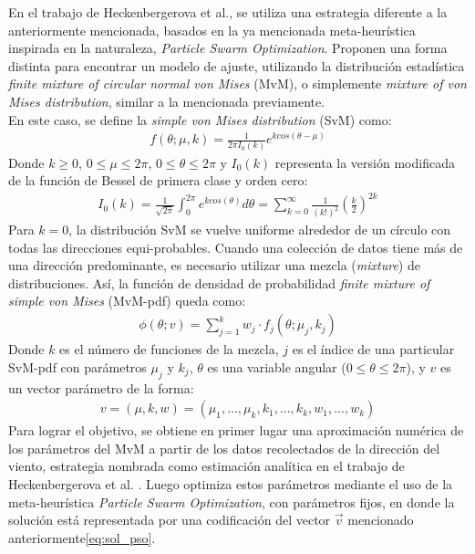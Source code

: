 En el trabajo de Heckenbergerova et al.\cite{Heckenbergerova15}, se utiliza una estrategia diferente a la anteriormente mencionada, basados en la ya mencionada meta-heurística inspirada en la naturaleza, \emph{Particle Swarm Optimization}. Proponen una forma distinta para encontrar un modelo de ajuste, utilizando la distribución estadística \emph{finite mixture of circular normal von Mises} (MvM), o simplemente \emph{mixture of von Mises distribution}, similar a la mencionada previamente.\\ 
En este caso, se define la \emph{simple von Mises distribution} (SvM) como:
\begin{align}\label{eq:simpleVonMises}
    f(\theta; \mu, k) = \frac{1}{2{\pi}I_{0}(k)}e^{k cos(\theta - \mu)}
\end{align}    
Donde $k \geq 0$, $0 \leq \mu \leq 2\pi$, $0 \leq \theta \leq 2\pi$ y $I_0(k)$ representa la versión modificada de la función de Bessel de primera clase y orden cero:
\begin{align}
    I_0(k) = \frac{1}{\sqrt{2\pi}}\int_0^{2\pi} e^{k cos(\theta)} d\theta = \sum_{k=0}^{\infty} \frac{1}{(k!)^2}(\frac{k}{2})^{2k}
\end{align}    
Para $k=0$, la distribución SvM se vuelve uniforme alrededor de un círculo con todas las direcciones equi-probables. Cuando una colección de datos tiene más de una dirección predominante, es necesario utilizar una mezcla (\emph{mixture}) de distribuciones.
Así, la función de densidad de probabilidad \emph{finite mixture of simple von Mises} (MvM-pdf) queda como:
\begin{align}\label{eq:mixtureVonMises}
    \phi(\theta; v) = \sum_{j=1}^{k} w_j \cdot f_j(\theta; \mu_j, k_j)
\end{align}    
Donde $k$ es el número de funciones de la mezcla, $j$ es el índice de una particular SvM-pdf con parámetros $\mu_j$ y $k_j$, $\theta$ es una variable angular ($0 \leq \theta \leq 2\pi$), y $v$ es un vector parámetro de la forma:
 \begin{align}\label{eq:sol_pso}
    v = (\mu, k, w) = (\mu_1, ..., \mu_k,k_1,...,k_k,w_1,...,w_k)
\end{align}
Para lograr el objetivo, se obtiene en primer lugar una aproximación numérica de los parámetros del MvM a partir de los datos recolectados de la dirección del viento, estrategia nombrada como estimación analítica en el trabajo de Heckenbergerova et al. \cite{Heckenbergerova15}. Luego optimiza estos parámetros mediante el uso de la meta-heurística \emph{Particle Swarm Optimization}, con parámetros fijos, en donde la solución está representada por una codificación del vector $\vec{v}$ mencionado anteriormente\ref{eq:sol_pso}.\\ 
